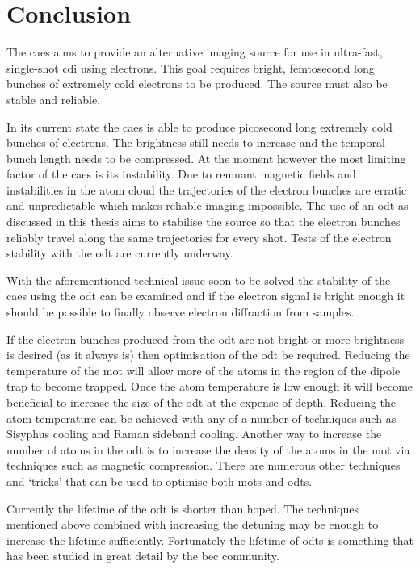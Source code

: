 \chapter{Conclusion}

The \gls{caes} aims to provide an alternative imaging source for use in ultra-fast, single-shot \gls{cdi} using electrons. This goal requires bright, femtosecond long bunches of extremely cold electrons to be produced. The source must also be stable and reliable.

In its current state the \gls{caes} is able to produce picosecond long extremely cold bunches of electrons. The brightness still needs to increase and the temporal bunch length needs to be compressed. At the moment however the most limiting factor of the \gls{caes} is its instability. Due to remnant magnetic fields and instabilities in the atom cloud the trajectories of the electron bunches are erratic and unpredictable which makes reliable imaging impossible. The use of an \gls{odt} as discussed in this thesis aims to stabilise the source so that the electron bunches reliably travel along the same trajectories for every shot. Tests of the electron stability with the \gls{odt} are currently underway.

With the aforementioned technical issue soon to be solved the stability of the \gls{caes} using the \gls{odt} can be examined and if the electron signal is bright enough it should be possible to finally observe electron diffraction from samples.

If the electron bunches produced from the \gls{odt} are not bright or more brightness is desired (as it always is) then optimisation of the \gls{odt} be required. Reducing the temperature of the \gls{mot} will allow more of the atoms in the region of the dipole trap to become trapped. Once the atom temperature is low enough it will become beneficial to increase the size of the \gls{odt} at the expense of depth. Reducing the atom temperature can be achieved with any of a number of techniques such as Sisyphus cooling\cite{metcalf_laser_1999} and Raman sideband cooling\cite{lee_raman_1996, metcalf_laser_1999}. Another way to increase the number of atoms in the \gls{odt} is to increase the density of the atoms in the \gls{mot} via techniques such as magnetic compression. There are numerous other techniques and `tricks' that can be used to optimise both \glspl{mot} and \glspl{odt}\cite{kuppens_loading_2000, grimm_optical_2000}.

Currently the lifetime of the \gls{odt} is shorter than hoped. The techniques mentioned above combined with increasing the detuning may be enough to increase the lifetime sufficiently. Fortunately the lifetime of \glspl{odt} is something that has been studied in great detail by the \gls{bec} community\cite{barrett_all-optical_2001, arnold_all-optical_2011}.


